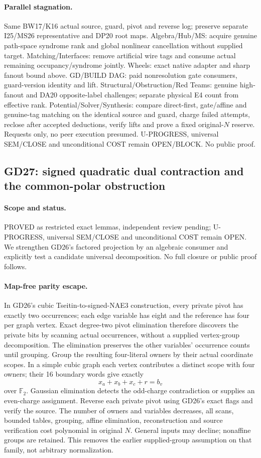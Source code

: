 \documentclass[11pt]{article}
\begin{document}
\paragraph{Parallel stagnation.}
Same BW17/K16 actual source, guard, pivot and reverse log; preserve separate I25/MS26 representative and DP20 root maps. Algebra/Hub/MS: acquire genuine path-space syndrome rank and global nonlinear cancellation without supplied target. Matching/Interfaces: remove artificial wire tags and consume actual remaining occupancy/syndrome jointly. Wheels: exact native adapter and sharp fanout bound above. GD/BUILD DAG: paid nonresolution gate consumers, guard-version identity and lift. Structural/Obstruction/Red Teams: genuine high-fanout and DA20 opposite-label challenges; separate physical E4 count from effective rank. Potential/Solver/Synthesis: compare direct-first, gate/affine and genuine-tag matching on the identical source and guard, charge failed attempts, reclose after accepted deductions, verify lifts and prove a fixed original-$N$ reserve. Requests only, no peer execution presumed. U-PROGRESS, universal SEM/CLOSE and unconditional COST remain OPEN/BLOCK. No public proof.


\subsection{GD27: signed quadratic dual contraction and the common-polar obstruction}
\label{sec:gd27}
\paragraph{Scope and status.}
PROVED as restricted exact lemmas, independent review pending; U-PROGRESS, universal SEM/CLOSE and unconditional COST remain OPEN. We strengthen GD26's factored projection by an algebraic consumer and explicitly test a candidate universal decomposition. No full closure or public proof follows.

\paragraph{Map-free parity escape.}
In GD26's cubic Tseitin-to-signed-NAE3 construction, every private pivot has exactly two occurrences; each edge variable has eight and the reference has four per graph vertex. Exact degree-two pivot elimination therefore discovers the private bits by scanning actual occurrences, without a supplied vertex-group decomposition. The elimination preserves the other variables' occurrence counts until grouping. Group the resulting four-literal owners by their actual coordinate scopes. In a simple cubic graph each vertex contributes a distinct scope with four owners; their 16 boundary words give exactly
\[
x_a+x_b+x_c+r=b_v
\]
over $\mathbb F_2$. Gaussian elimination detects the odd-charge contradiction or supplies an even-charge assignment. Reverse each private pivot using GD26's exact flags and verify the source. The number of owners and variables decreases, all scans, bounded tables, grouping, affine elimination, reconstruction and source verification cost polynomial in original $N$. General inputs may decline; nonaffine groups are retained. This removes the earlier supplied-group assumption on that family, not arbitrary normalization.
\end{document}
